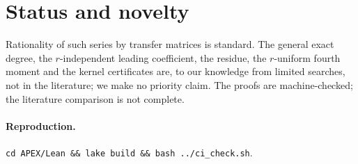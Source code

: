 \documentclass[11pt]{article}
\theoremstyle{remark}\newtheorem{remark}[theorem]{Remark}
\begin{document}
\section{Status and novelty}
Rationality of such series by transfer matrices is standard. The general exact degree, the $r$-independent leading coefficient, the residue, the $r$-uniform fourth moment and the kernel certificates are, to our knowledge from limited searches, not in the literature; we make no priority claim. The proofs are machine-checked; the literature comparison is not complete.

\paragraph{Reproduction.} \texttt{cd APEX/Lean \&\& lake build \&\& bash ../ci\_check.sh}.
\end{document}
